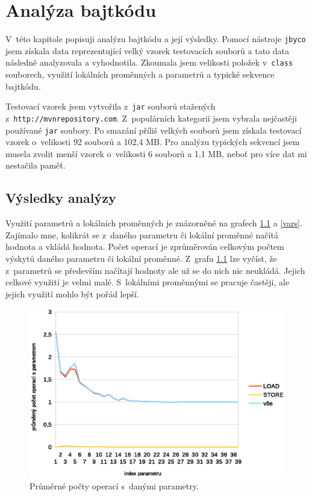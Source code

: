 \chapter{Analýza bajtkódu}\label{Analysis}


V~této kapitole popisuji analýzu bajtkódu a její výsledky. Pomocí nástroje \texttt{jbyco} jsem získala data reprezentující velký vzorek testovacích souborů a tato data následně analyzovala a vyhodnotila. Zkoumala jsem velikosti položek v~\texttt{class} souborech, využití lokálních proměnných a parametrů a typické sekvence bajtkódu.

Testovací vzorek jsem vytvořila z~\texttt{jar} souborů stažených z~\texttt{http://mvnrepository.com}. Z~populárních kategorií jsem vybrala nejčastěji používané \texttt{jar} soubory. Po smazání příliš velkých souborů jsem získala testovací vzorek o~velikosti 92 souborů a 102,4 MB. Pro analýzu typických sekvencí jsem musela zvolit menší vzorek o~velikosti 6 souborů a 1,1 MB, neboť pro více dat mi nestačila paměť.

\section{Výsledky analýzy}\label{AnalysisResults}

Využití parametrů a lokálních proměnných je znázorněné na grafech \ref{params} a \ref{vars}. Zajímalo mne, kolikrát se z~daného parametru či lokální proměnné načítá hodnota a vkládá hodnota. Počet operací je zprůměrován celkovým počtem výskytů daného parametru či lokální proměnné. Z~grafu \ref{params} lze vyčíst, že z~parametrů se především načítají hodnoty ale už se do nich nic neukládá. Jejich celkové využití je velmi malé. S~lokálními proměnnými se pracuje častěji, ale jejich využití mohlo být pořád lepší.

\begin{figure}[h!]
\centering
\includegraphics[scale=0.9]{fig/params.eps}
\caption{Průměrné počty operací s~danými parametry.}\label{params}
\end{figure}

